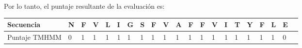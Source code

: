 Por lo tanto, el puntaje resultante de la evaluación es:

\vspace{0.5cm}
\noindent
\begin{tabular}{lllllllllllllllllllll} 
\hline 
Secuencia & \textbf{N} & \textbf{F} & \textbf{V} & \textbf{L} & \textbf{I} & \textbf{G} & \textbf{S} & \textbf{F} & \textbf{V} & \textbf{A} & \textbf{F} & \textbf{F} & \textbf{V} & \textbf{I} & \textbf{T} & \textbf{Y} & \textbf{F} & \textbf{L} & \textbf{E}  \\ \hline
Puntaje TMHMM & 0 & 1 & 1 & 1 & 1 & 1 & 1 & 1 & 1 & 1 & 1 & 1 & 1 & 1 & 1 & 1 & 1 & 1 & 0\\ \hline
\end{tabular}



 
 
 
 



% 
% 


